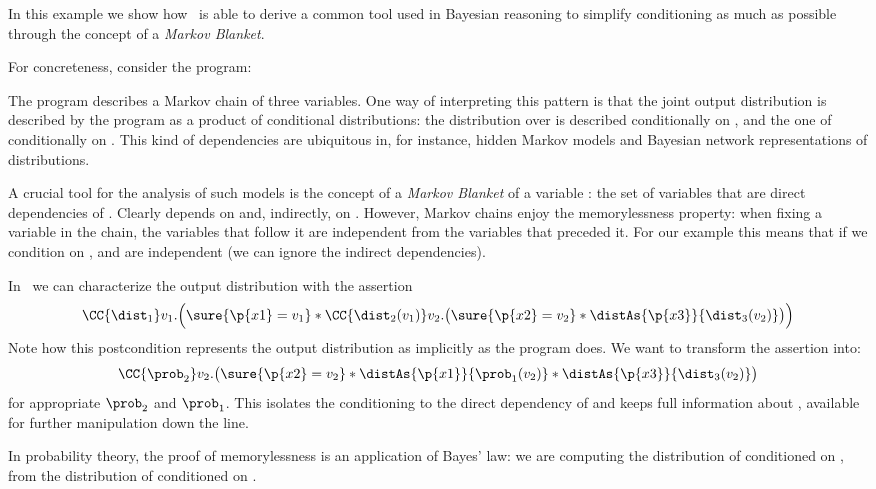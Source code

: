 In this example we show how \thelogic\ is able to derive a common
tool used in Bayesian reasoning to simplify conditioning as much as possible
through the concept of a \emph{Markov Blanket}.

For concreteness, consider the program:
\begin{center}
\end{center}
The program describes a Markov chain of three variables.
One way of interpreting this pattern is that the joint output distribution
is described by the program as a product of conditional distributions:
the distribution over  is described conditionally on ,
and the one of  conditionally on .
This kind of dependencies are ubiquitous in, for instance, hidden Markov models and Bayesian network representations of distributions.

A crucial tool for the analysis of such models is the concept of a
\emph{Markov Blanket} of a variable : the set of variables that are direct dependencies of .
Clearly  depends on  and, indirectly, on .
However, Markov chains enjoy the memorylessness property:
when fixing a variable in the chain, the variables that follow it are independent from the variables that preceded it.
For our example this means that if we condition on ,
 and  are independent (\ie we can ignore the indirect dependencies).

In \thelogic\ we can characterize the output distribution with the assertion
\[
  \CC{\dist_1} v_1. \Bigl(
    \sure{\p{x1}=v_1} *
    \CC{\dist_2(v_1)} v_2. \bigl(
      \sure{\p{x2}=v_2} *
      \distAs{\p{x3}}{\dist_3(v_2)}
    \bigr)
  \Bigr)
\]
Note how this postcondition represents the output distribution
as implicitly as the program does.
We want to transform the assertion into:
\[
  \CC{\prob_2} v_2.
  \bigl(
    \sure{\p{x2}=v_2} *
    \distAs{\p{x1}}{\prob_1(v_2)} *
    \distAs{\p{x3}}{\dist_3(v_2)}
  \bigr)
\]
for appropriate $\prob_2$ and $\prob_1$.
This isolates the conditioning to the direct dependency of 
and keeps full information about ,
available for further manipulation down the line.

In probability theory, the proof of memorylessness is an application
of Bayes' law: we are computing
the distribution of  conditioned on ,
from the distribution of  conditioned on .


